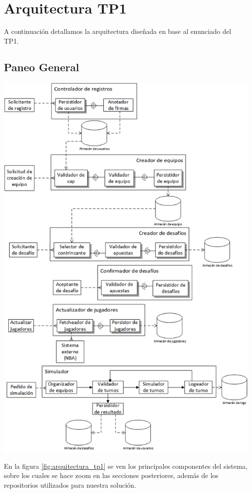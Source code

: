 \section{Arquitectura TP1}
A continuación detallamos la arquitectura diseñada en base al enunciado del TP1.

\subsection{Paneo General}
\begin{center}
\includegraphics[scale=0.70]{diagramas/tp1/arquitectura_tp1.png}
\end{center}
\label{fig:arquitectura_tp1}

En la figura \ref{fig:arquitectura_tp1} se ven los principales componentes del sistema, sobre los cuales se hace zoom en las secciones posteriores, además de los repositorios utilizados para nuestra solución.

